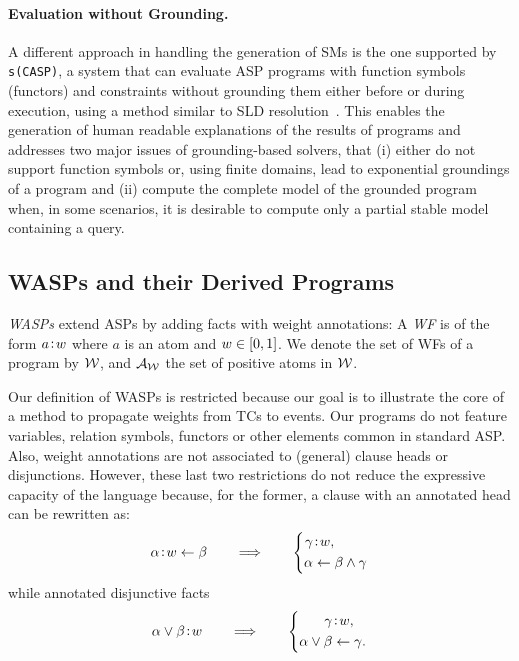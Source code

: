 \documentclass[x11names]{tlp}
\renewcommand{\cite}{\citep}
\begin{document}
\paragraph{Evaluation without Grounding.}

A different approach in handling the generation of \aclp{SM} is the one supported by \texttt{s(CASP)}, a system that can evaluate ASP programs with function symbols (functors) and constraints without grounding them either before or during execution, using a method similar to SLD resolution~\cite{marple2017computing,arias2020justifications}.
%
%
This enables the generation of human readable explanations of the results of programs and addresses two major issues of grounding-based solvers, that 
(i) either do not support function symbols or, using finite domains, lead to exponential groundings of a program and 
(ii) compute the complete model of the grounded program when, in some scenarios, it is desirable to compute only a partial stable model containing a query.%

\subsection*{\acsp{WASP} and their Derived Programs}

\emph{\Acfp{WASP}} extend \acp{ASP} by adding facts with weight annotations: A \emph{\ac{WF}} is of the form $a\!:\!w$ where $a$ is an atom and $w\in\intcc{0,1}$.
%
We denote the set of \aclp{WF} of a program by $\WEIGHTFset$, and $\WATOMset$ the set of positive atoms in $\WEIGHTFset$.

Our definition of \acp{WASP} is restricted because our goal is to illustrate the core of a method to propagate weights from \aclp{TC} to events.
Our programs do not feature variables, relation symbols, functors or other elements common in standard \ac{ASP}.
Also, weight annotations are not associated to (general) clause heads or disjunctions.
However, these last two restrictions do not reduce the expressive capacity of the language because, for the former, a clause with an annotated head can be rewritten as:
\begin{equation*}
	\weightrule{\alpha}{w}{\beta} \qquad \Longrightarrow \qquad
	\left\{
		\begin{aligned}
		\weightfact{\gamma & }{w},                       %
		\\
		\alpha           & \clause \beta \wedge \gamma
	\end{aligned}
	\right.
\end{equation*}
while annotated disjunctive facts
\begin{equation*}
	\weightfact{\alpha \vee \beta}{w} \qquad \Longrightarrow \qquad
	\left\{
	\begin{aligned}
		\weightfact{\gamma  & }{w},           %
		\\
		\alpha \vee \beta & \clause \gamma.
	\end{aligned}
	\right.
\end{equation*}
\end{document}
